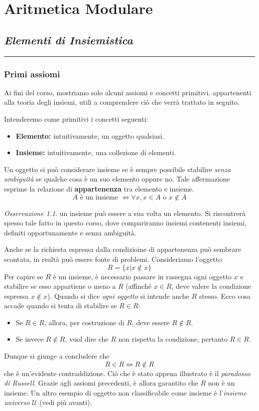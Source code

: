 \documentclass[oneside]{book}
\theoremstyle{remark}
\newtheorem*{osservaz}{Osservazione}
\newcommand{\chptr}[1]{\chapter{\textit{#1}}\noindent\rule{\textwidth}{1pt}}
\begin{document}
\tableofcontents



\part{Aritmetica Modulare}


\chptr{Elementi di Insiemistica}
\section{Primi assiomi}
Ai fini del corso, mostriamo solo alcuni assiomi e concetti primitivi,
appartenenti alla teoria degli insiemi, utili a comprendere ciò che
verrà trattato in seguito.

\begin{tcolorbox}[colback=yellow!30, colframe=yellow!30!black, title={Elemento, insieme, appartenenza}]
Intenderemo come primitivi i concetti seguenti:
\begin{itemize}
    \item \textbf{Elemento:} intuitivamente, un oggetto qualsiasi.
    \item \textbf{Insieme:} intuitivamente, una collezione di elementi.
\end{itemize}
Un oggetto si può considerare insieme se è sempre possibile stabilire
\emph{senza ambiguità} se qualche cosa è un suo elemento oppure no.
Tale affermazione esprime la relazione di \textbf{appartenenza}
tra elemento e insieme.
\[ A \text{ è un insieme } \Longleftrightarrow \forall x,x\in A \text{ o } x\not\in A \]
\end{tcolorbox}

\begin{osservaz}
un insieme può essere a sua volta un elemento.
Si riscontrerà spesso tale fatto in questo corso, dove compariranno
insiemi contenenti insiemi, definiti opportunamente e senza ambiguità.
\end{osservaz}

\noindent Anche se la richiesta espressa dalla condizioine di appartenenza può sembrare
scontata, in realtà può essere fonte di problemi. Consideriamo l'oggetto
\[ R = \{x|x\not\in x\} \]
Per capire se $R$ è un insieme, è necessario passare in rassegna ogni oggetto
$x$ e stabilire se esso appartiene o meno a $R$ (affinché $x\in R$, deve valere
la condizione espressa $x\not\in x$). Quando si dice \textit{ogni oggetto} si
intende anche $R$ stesso. Ecco cosa accade quando si tenta di stabilire se
$R\in R$:
\begin{itemize}
\item Se $R\in R$, allora, per costruzione di $R$, deve essere $R\not\in R$.
\item Se invece $R\not\in R$, vuol dire che $R$ non rispetta la condizione, pertanto $R\in R$.
\end{itemize}
Dunque si giunge a concludere che \[ R\in R \Longleftrightarrow R\not\in R \]
che è un'evidente contraddizione. Ciò che è stato appena illustrato è il \textit{paradosso
di Russell}. Grazie agli assiomi precedenti, è allora garantito che $R$ non è
un insieme. Un altro esempio di oggetto non classificabile come insieme è
l'\textit{insieme universo} $\mathcal{U}$ (vedi più avanti).
\end{document}
